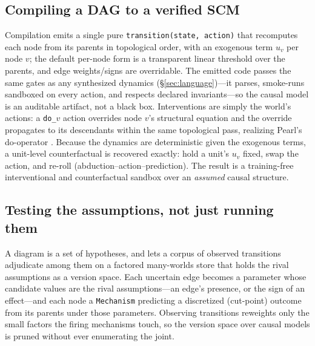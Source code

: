 \subsection{Compiling a DAG to a verified SCM}
Compilation emits a single pure \texttt{transition(state, action)} that
recomputes each node from its parents in topological order, with an exogenous
term $u_v$ per node $v$; the default per-node form is a transparent
linear threshold over the parents, and edge weights/signs are overridable. The
emitted code passes the same gates as any synthesized dynamics
(\S\ref{sec:language})---it parses, smoke-runs sandboxed on every action, and
respects declared invariants---so the causal model is an auditable artifact, not
a black box. Interventions are simply the world's actions: a \texttt{do\_$v$}
action overrides node $v$'s structural equation and the override propagates to
its descendants within the same topological pass, realizing Pearl's do-operator
\cite{pearl2009causality}. Because the dynamics are deterministic given the
exogenous terms, a unit-level counterfactual is recovered exactly: hold a unit's
$u_v$ fixed, swap the action, and re-roll (abduction--action--prediction). The
result is a training-free interventional and counterfactual sandbox over an
\emph{assumed} causal structure.

\subsection{Testing the assumptions, not just running them}
A diagram is a set of hypotheses, and \openworld{} lets a corpus of observed
transitions adjudicate among them on a factored many-worlds store that holds the
rival assumptions as a version space. Each uncertain edge becomes a parameter whose
candidate values are the rival assumptions---an edge's presence, or the sign of
an effect---and each node a \texttt{Mechanism} predicting a discretized
(cut-point) outcome from its parents under those parameters. Observing
transitions reweights only the small factors the firing mechanisms touch, so the
version space over causal models is pruned without ever enumerating the joint.

